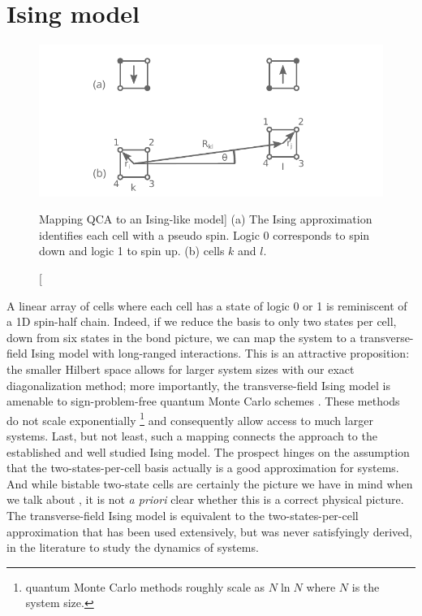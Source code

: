 \section{Ising model}


%
\begin{figure}
  \center
  \includegraphics{ising}
  \caption
  [Mapping QCA to an Ising-like model]
  {
  (a) The Ising approximation identifies each cell with a pseudo spin. Logic 0
  corresponds to spin down and logic 1 to spin up. (b)  cells $k$ and
  $l$. 
  }
  \label{fig:ising}
\end{figure}
%
A linear array of  cells where each cell has a state of logic 0 or 1
is reminiscent of a 1D spin-half chain. Indeed, if we reduce the basis to only
two states per cell, down from six states in the bond picture, we can map the
 system to a transverse-field Ising model with long-ranged
interactions. This is an attractive proposition: the smaller Hilbert space
allows for larger system sizes with our exact diagonalization method; more
importantly, the transverse-field Ising model is amenable to sign-problem-free
 quantum Monte Carlo schemes \cite{Sandvik2003}. These methods do not
scale exponentially%
%
\footnote{
 quantum Monte Carlo methods roughly scale as $N \ln N$ where $N$ is
the system size.
}
%
and consequently allow access to much larger systems. Last, but not least, such
a mapping connects the  approach to the established and well studied
Ising model. The prospect hinges on the assumption that the two-states-per-cell
basis actually is a good approximation for  systems. And while
bistable two-state cells are certainly the picture we have in mind when we talk
about , it is not \emph{a priori} clear whether this is a correct
physical picture. The transverse-field Ising model is equivalent to the
two-states-per-cell approximation that has been used extensively, but was never
satisfyingly derived, in the literature to study the dynamics of 
systems.


